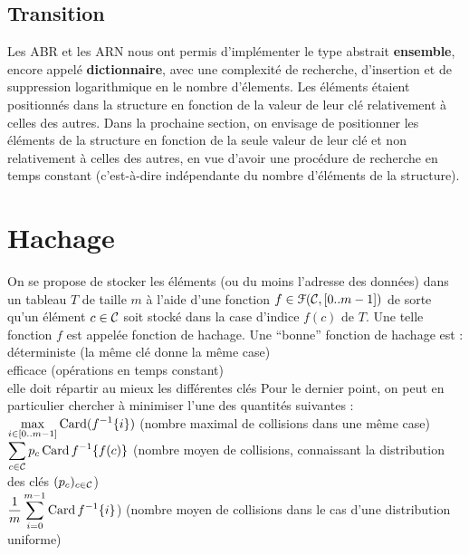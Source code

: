 	\subsection{Transition}
	
		Les ABR et les ARN nous ont permis d'implémenter le type abstrait \textbf{ensemble}, encore appelé \textbf{dictionnaire}, avec une complexité de recherche, d'insertion et de suppression logarithmique en le nombre d'élements. Les éléments étaient positionnés dans la structure en fonction de la valeur de leur clé relativement à celles des autres. \nll
		Dans la prochaine section, on envisage de positionner les éléments de la structure en fonction de la seule valeur de leur clé et non relativement à celles des autres, en vue d'avoir une procédure de recherche en temps constant (c'est-à-dire indépendante du nombre d'éléments de la structure).
		
\section{Hachage}
	
	
	On se propose de stocker les éléments (ou du moins l'adresse des données) dans un tableau \(T\) de taille \(m\) à l'aide d'une fonction \(f\in\EuScript{F}(\cal{C},[0..m-1])\) de sorte qu'un élément \(c\in\cal{C}\) soit stocké dans la case d'indice \(f(c)\) de \(T\). \nt
	Une telle fonction \(f\) est appelée fonction de hachage. \nll
	Une ``bonne'' fonction de hachage est : \\
		 \bdot déterministe (la même clé donne la même case) \\
		 \bdot efficace (opérations en temps constant) \\
		 \bdot elle doit répartir au mieux les différentes clés \nt
	Pour le dernier point, on peut en particulier chercher à minimiser l'une des quantités suivantes : \\
		 \bdot \(\displaystyle \max_{i\in[0..m-1]} \card(f^{-1}\{i\})\) (nombre maximal de collisions dans une même case) \\
		 \bdot \(\displaystyle \sum_{c\in\cal{C}} p_c \card f^{-1} \{f(c)\}\) (nombre moyen de collisions, connaissant la distribution des clés \((p_c)_{c\in\cal{C}}\)) \\
		 \bdot \(\displaystyle \frac{1}{m}\sum_{i=0}^{m-1} \card f^{-1} \{i\}\)) (nombre moyen de collisions dans le cas d'une distribution uniforme)
		
